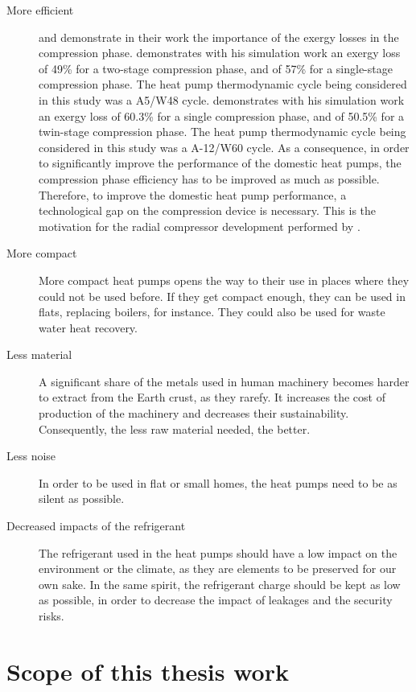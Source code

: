 \begin{description}
\item[More efficient] \citet{Zehnder-2004a} and
  \citet{barbouchi-2007a} demonstrate in their work the importance of
  the exergy losses in the compression phase.  \citet[Fig.\,I.2
  p.\,206]{barbouchi-2007a} demonstrates with his simulation work an
  exergy loss of 49\% for a two-stage compression phase, and of 57\%
  for a single-stage compression phase. The heat pump thermodynamic
  cycle being considered in this study was a A5/W48
  cycle. \citet[p.\,227]{Zehnder-2004a} demonstrates with his
  simulation work an exergy loss of 60.3\% for a single compression
  phase, and of 50.5\% for a twin-stage compression phase. The heat
  pump thermodynamic cycle being considered in this study was a
  A-12/W60 cycle. As a consequence, in order to significantly improve
  the performance of the domestic heat pumps, the compression phase
  efficiency has to be improved as much as possible. Therefore, to
  improve the domestic heat pump performance, a technological gap on
  the compression device is necessary. This is the motivation for the
  radial compressor development performed by \citet{schiffmann-2008a}.
\item[More compact] More compact heat pumps opens the way to their use
  in places where they could not be used before. If they get compact
  enough, they can be used in flats, replacing boilers, for
  instance. They could also be used for waste water heat recovery.
\item[Less material] A significant share of the metals used in human
  machinery becomes harder to extract from the Earth crust, as they
  rarefy. It increases the cost of production of the machinery and
  decreases their sustainability. Consequently, the less raw material
  needed, the better.
\item[Less noise] In order to be used in flat or small homes, the heat
  pumps need to be as silent as possible.
\item[Decreased impacts of the refrigerant] The refrigerant used in
  the heat pumps should have a low impact on the environment or the
  climate, as they are elements to be preserved for our own sake. In
  the same spirit, the refrigerant charge should be kept as low as
  possible, in order to decrease the impact of leakages and the
  security risks.
\end{description}

\section{Scope of this thesis work}
\label{sec:intro-thesis-scope}

